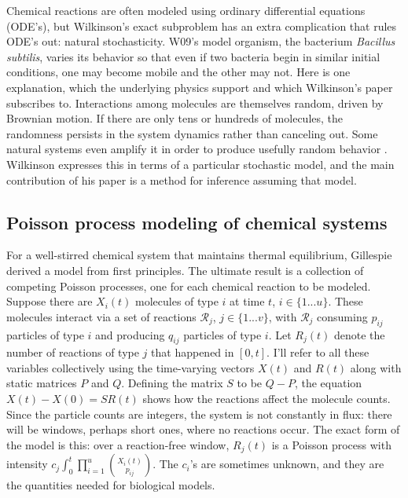 \documentclass{article}
\begin{document}
Chemical reactions are often modeled using ordinary differential equations (ODE's), but Wilkinson's exact subproblem has an extra complication that rules ODE's out: natural stochasticity. W09's model organism, the bacterium {\it Bacillus subtilis}, varies its behavior so that even if two bacteria begin in similar initial conditions, one may become mobile and the other may not. Here is one explanation, which the underlying physics support and which  Wilkinson's paper subscribes to. Interactions among molecules are themselves random, driven by Brownian motion. If there are only tens or hundreds of molecules, the randomness persists in the system dynamics rather than canceling out. Some natural systems even amplify it in order to produce usefully random behavior \cite{reinker2006parameter}. Wilkinson expresses this in terms of a particular stochastic model, and the main contribution of his paper is a method for inference assuming that model.
 

\subsection{Poisson process modeling of chemical systems}

For a well-stirred chemical system that maintains thermal equilibrium, Gillespie  \cite{gillespie1992rigorous} derived a model from first principles. The ultimate result is a collection of competing Poisson processes, one for each chemical reaction to be modeled. Suppose there are $X_{i}(t)$ molecules of type $i$ at time $t$, $i\in \{1 ... u\}$. These molecules interact via a set of reactions $\mathcal{R}_{j}$, $j\in \{1 ... v\}$, with $\mathcal{R}_{j}$ consuming $p_{ij}$ particles of type $i$ and producing $q_{ij}$ particles of type $i$. Let $R_{j}(t)$ denote the number of reactions of type $j$ that happened in $[0,t]$. I'll refer to all these variables collectively using the time-varying vectors $X(t)$ and $R(t)$ along with static matrices $P$ and $Q$. Defining the matrix $S$ to be $Q-P$, the equation $X(t) - X(0) = SR(t)$ shows how the reactions affect the molecule counts. Since the particle counts are integers, the system is not constantly in flux: there will be windows, perhaps short ones, where no reactions occur. The exact form of the model is this: over a reaction-free window, $R_{j}(t)$ is a Poisson process with intensity $c_{j}\int_0^t \prod_{i=1}^u {{X_i(t)}\choose{p_{ij}}}$. %
The $c_{i}$'s are sometimes unknown, and they are the quantities needed for biological models.
\end{document}
